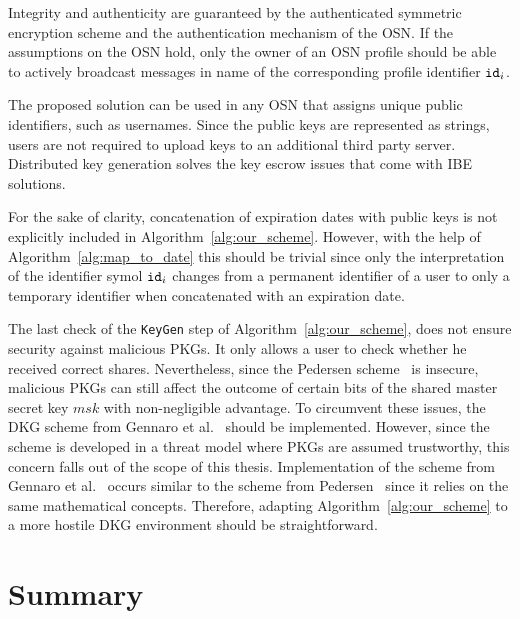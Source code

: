 Integrity and authenticity are guaranteed by the authenticated symmetric encryption scheme and the authentication mechanism of the OSN. If the assumptions on the OSN hold, only the owner of an OSN profile should be able to actively broadcast messages in name of the corresponding profile identifier $\mathtt{id}_{i}$.

The proposed solution can be used in any OSN that assigns unique public identifiers, such as usernames. Since the public keys are represented as strings, users are not required to upload keys to an additional third party server. Distributed key generation solves the key escrow issues that come with IBE solutions.

For the sake of clarity, concatenation of expiration dates with public keys is not explicitly included in Algorithm~\ref{alg:our_scheme}. However, with the help of Algorithm~\ref{alg:map_to_date} this should be trivial since only the interpretation of the identifier symol $\mathtt{id}_{i}$ changes from a permanent identifier of a user to only a temporary identifier when concatenated with an expiration date.

The last check of the \texttt{KeyGen} step of Algorithm~\ref{alg:our_scheme}, does not ensure security against malicious PKGs. It only allows a user to check whether he received correct shares. Nevertheless, since the Pedersen scheme~\cite{art:Pedersen91a} is insecure, malicious PKGs can still affect the outcome of certain bits of the shared master secret key $msk$ with non-negligible advantage. To circumvent these issues, the DKG scheme from Gennaro et al.~\cite{art:GennaroJKR07} should be implemented. However, since the scheme is developed in a threat model where PKGs are assumed trustworthy, this concern falls out of the scope of this thesis. Implementation of the scheme from Gennaro et al.~\cite{art:GennaroJKR07} occurs similar to the scheme from Pedersen~\cite{art:Pedersen91a} since it relies on the same mathematical concepts. Therefore, adapting Algorithm~\ref{alg:our_scheme} to a more hostile DKG environment should be straightforward.

\section{Summary}


\newpage

